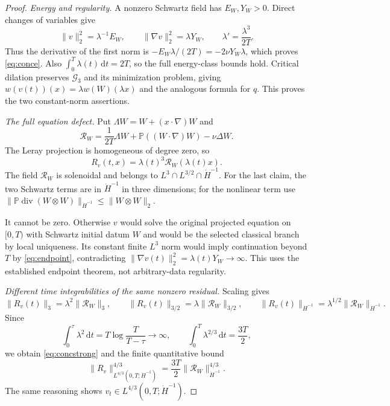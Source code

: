 \documentclass[11pt,a4paper]{article}
\theoremstyle{definition}\newtheorem{definition}[theorem]{Definition}
\theoremstyle{remark}\newtheorem{remark}[theorem]{Remark}
\newcommand{\G}{\mathcal G_3}
\newcommand{\PP}{\mathbb P}
\newcommand{\dd}{\,\mathrm d}
\newcommand{\norm}[1]{\lVert #1\rVert}
\newcommand{\diver}{\operatorname{div}}
\numberwithin{equation}{section}
\begin{document}
\begin{proof}
\emph{Energy and regularity.}
A nonzero Schwartz field has $E_W,Y_W>0$. Direct changes of variables give
\[
 \norm v_2^2=\lambda^{-1}E_W,\qquad
 \norm{\nabla v}_2^2=\lambda Y_W,\qquad \lambda'=\frac{\lambda^3}{2T}.
\]
Thus the derivative of the first norm is $-E_W\lambda/(2T)=-2\nu Y_W\lambda$, which proves \eqref{eq:conce}. Also $\int_0^T\lambda(t)\dd t=2T$, so the full energy-class bounds hold. Critical dilation preserves $\G$ and its minimization problem, giving
$w(v(t))(x)=\lambda w(W)(\lambda x)$ and the analogous formula for $q$. This proves the two constant-norm assertions.

\emph{The full equation defect.}
Put $\Lambda W=W+(x\cdot\nabla)W$ and
\begin{equation}\label{eq:profileR}
 \mathcal R_W=\frac1{2T}\Lambda W
              +\PP((W\cdot\nabla)W)-\nu\Delta W.
\end{equation}
The Leray projection is homogeneous of degree zero, so
\begin{equation}\label{eq:scaledR}
 R_v(t,x)=\lambda(t)^3\mathcal R_W(\lambda(t)x).
\end{equation}
The field $\mathcal R_W$ is solenoidal and belongs to $L^3\cap L^{3/2}\cap\dot H^{-1}$. For the last claim, the two Schwartz terms are in $\dot H^{-1}$ in three dimensions; for the nonlinear term use
$\norm{\PP\diver(W\otimes W)}_{\dot H^{-1}}\le\norm{W\otimes W}_2$.

It cannot be zero. Otherwise $v$ would solve the original projected equation on $[0,T)$ with Schwartz initial datum $W$ and would be the selected classical branch by local uniqueness. Its constant finite $L^3$ norm would imply continuation beyond $T$ by \eqref{eq:endpoint}, contradicting $\norm{\nabla v(t)}_2^2=\lambda(t)Y_W\to\infty$. This uses the established endpoint theorem, not arbitrary-data regularity.

\emph{Different time integrabilities of the same nonzero residual.}
Scaling gives
\[
 \norm{R_v(t)}_3=\lambda^2\norm{\mathcal R_W}_3,\qquad
 \norm{R_v(t)}_{3/2}=\lambda\norm{\mathcal R_W}_{3/2},\qquad
 \norm{R_v(t)}_{\dot H^{-1}}=\lambda^{1/2}\norm{\mathcal R_W}_{\dot H^{-1}}.
\]
Since
\begin{equation}\label{eq:lambdaints}
 \int_0^\tau\lambda^2\dd t=T\log\frac{T}{T-\tau}\longrightarrow\infty,
 \qquad \int_0^T\lambda^{2/3}\dd t=\frac{3T}{2},
\end{equation}
we obtain \eqref{eq:concstrong} and the finite quantitative bound
\begin{equation}\label{eq:concweak}
 \norm{R_v}_{L^{4/3}(0,T;\dot H^{-1})}^{4/3}
 =\frac{3T}{2}\norm{\mathcal R_W}_{\dot H^{-1}}^{4/3}.
\end{equation}
The same reasoning shows $v_t\in L^{4/3}(0,T;\dot H^{-1})$.


\end{proof}
\end{document}
